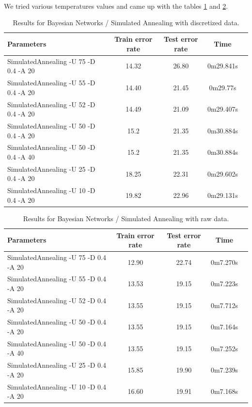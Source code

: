 \documentclass[a4paper]{llncs}
\begin{document}
We tried various temperatures values and came up with the tables \ref{tbl:results_bayesian_networks_sa_discr} and
\ref{tbl:results_bayesian_networks_sa_raw}.

\begin{table}[ht]
  \begin{center}
  \begin{tabular}{ | l | c | c | c | c |}
    \hline
    \textbf{Parameters} & \textbf{Train error rate} & \textbf{Test error rate} & \textbf{Time} \\ \hline
    SimulatedAnnealing -U 75 -D 0.4 -A 20 & 14.32 & 26.80 & 0m29.841s \\ \hline
    SimulatedAnnealing -U 55 -D 0.4 -A 20 & 14.40 & 21.45 & 0m29.77s \\ \hline
    SimulatedAnnealing -U 52 -D 0.4 -A 20 & 14.49 & 21.09 & 0m29.407s \\ \hline
    SimulatedAnnealing -U 50 -D 0.4 -A 20 & 15.2 & 21.35 & 0m30.884s \\ \hline
    SimulatedAnnealing -U 50 -D 0.4 -A 40 & 15.2 & 21.35 & 0m30.884s \\ \hline
    SimulatedAnnealing -U 25 -D 0.4 -A 20 & 18.25 & 22.31 & 0m29.602s \\ \hline
    SimulatedAnnealing -U 10 -D 0.4 -A 20 & 19.82 & 22.96 & 0m29.131s \\ \hline
  \end{tabular}
  \caption{Results for Bayesian Networks / Simulated Annealing with discretized data.}
  \label{tbl:results_bayesian_networks_sa_discr}
  \end{center}
\end{table}

\begin{table}[ht]
  \begin{center}
  \begin{tabular}{ | l | c | c | c | c |}
    \hline
    \textbf{Parameters} & \textbf{Train error rate} & \textbf{Test error rate} & \textbf{Time} \\ \hline
    SimulatedAnnealing -U 75 -D 0.4 -A 20 & 12.90 & 22.74 & 0m7.270s \\ \hline
    SimulatedAnnealing -U 55 -D 0.4 -A 20 & 13.53 & 19.15 & 0m7.223s \\ \hline
    SimulatedAnnealing -U 52 -D 0.4 -A 20 & 13.55 & 19.15 & 0m7.712s \\ \hline
    SimulatedAnnealing -U 50 -D 0.4 -A 20 & 13.55 & 19.15 & 0m7.164s \\ \hline
    SimulatedAnnealing -U 50 -D 0.4 -A 40 & 13.55 & 19.15 & 0m7.252s \\ \hline
    SimulatedAnnealing -U 25 -D 0.4 -A 20 & 15.85 & 19.90 & 0m7.239s \\ \hline
    SimulatedAnnealing -U 10 -D 0.4 -A 20 & 16.60 & 19.91 & 0m7.168s \\ \hline
  \end{tabular}
  \caption{Results for Bayesian Networks / Simulated Annealing with raw data.}
  \label{tbl:results_bayesian_networks_sa_raw}
  \end{center}
\end{table}
\end{document}
